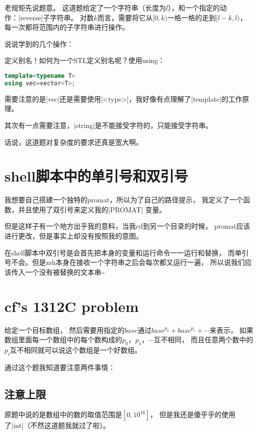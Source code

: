 老规矩先说题意。
这道题给定了一个字符串（长度为$l$），和一个指定的动作：\vb|reverse|子字符串。
对数$k$而言，需要将它从$[0, k)$一格一格的走到$[l-k,l)$，
每一次都将范围内的子字符串进行操作。

说说学到的几个操作：

定义别名！如何为一个STL定义别名呢？使用using：
\begin{lstlisting}[language=C++]
template<typename T>
using vec=vector<T>;
\end{lstlisting}

需要注意的是\vb|vec|还是需要使用\vb|<type>|，我好像有点理解了\vb|template|的工作原理。

其次有一点需要注意，\vb|string|是不能接受字符的，只能接受字符串。

话说，这道题对复杂度的要求还真是宽大啊。


\section{shell脚本中的单引号和双引号}

我想要自己搭建一个独特的promat，所以为了自己的路径提示，
我定义了一个函数，并且使用了双引号来定义我的\vb|PROMAT|
变量。

但是这样子有一个地方出乎我的意料，当我cd到另一个目录的时候，
promat应该进行更改，但是事实上却没有按照我的意图。

在shell脚本中双引号是会首先把本身的变量和运行命令一一运行和替换，
而单引号不会。但是zsh本身在接收一个字符串之后会每次都又运行一遍，
所以说我们应该传入一个没有被替换的文本串\~{}


\section{cf's 1312C problem}

给定一个目标数组，
然后需要用指定的$base$通过$base^{p_0}+base^{p_1}+\cdots$来表示，
如果数组里面每一个数组中的每个数构成的$p_0$，$p_1$，$\cdots$互不相同，
而且任意两个数中的$p_i$互不相同就可以说这个数组是一个好数组。

通过这个题我知道要注意两件事情：

\subsection{注意上限}
原题中说的是数组中的数的取值范围是$[0,10^{16}]$，
但是我还是傻乎乎的使用了\vb|int|（不然这道题我就过了啦）。

